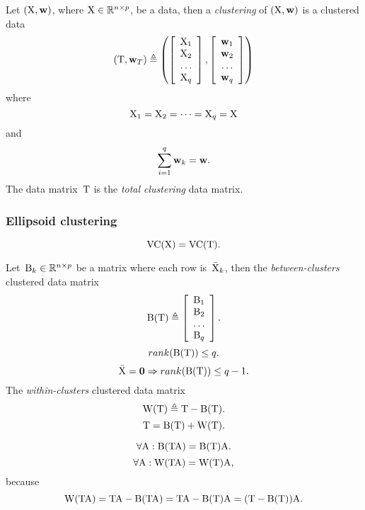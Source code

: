 \documentclass[10pt,a4paper]{article}
\theoremstyle{plain} \newtheorem{Lem}{Lemma}
\begin{document}
\bigskip
Let $(\mathrm X, \mathbf w)$, where $\mathrm X \in \mathbb R^{n \times p}$, be a data, then a {\em clustering} of $(\mathrm X, \mathbf w)$ is a clustered data 
$$ (\mathrm T, \mathbf w_T) \triangleq
   \left (
     \left[ 
       \begin{array}{c} 
         \mathrm X_1 \\ 
         \mathrm X_2 \\ 
         \dots \\ 
         \mathrm X_q 
       \end{array} 
     \right],
     \left[ 
       \begin{array}{c} 
          \mathbf w_1 \\ 
          \mathbf w_2 \\ 
          \dots \\ 
          \mathbf w_q 
       \end{array} 
     \right]
   \right)
$$
where 
$$ \mathrm X_1 = \mathrm X_2 = \dots = \mathrm X_q = \mathrm X $$
and
$$ \sum_{i=1}^q \mathbf w_k = \mathbf w. $$
The data matrix~$\mathrm T$ is the {\em total clustering} data matrix.


\subsubsection{Ellipsoid clustering}

\bigskip
$$ \mathrm {VC}(\mathrm X) = \mathrm {VC} (\mathrm T). $$

\bigskip
Let~$\mathrm B_k \in \mathbb R^{n \times p}$ be a matrix where each row is~$\bar {\mathrm X}_k$,
then the {\em between-clusters} clustered data matrix
$$ \mathrm B(\mathrm T) \triangleq 
     \left[ 
       \begin{array}{c} 
         \mathrm B_1 \\ 
         \mathrm B_2 \\ 
         \dots \\ 
         \mathrm B_q 
       \end{array} 
     \right].
$$
$$ rank(\mathrm B(\mathrm T)) \le q. $$
$$ \bar {\mathrm X} = \mathbf 0 \Rightarrow rank(\mathrm B(\mathrm T)) \le q - 1. $$
The {\em within-clusters} clustered data matrix
$$ \mathrm W(\mathrm T) \triangleq \mathrm T - \mathrm B(\mathrm T). $$
$$ \mathrm T = \mathrm B(\mathrm T) + \mathrm W(\mathrm T). $$

\bigskip
$$ \forall \mathrm A : \mathrm B(\mathrm T \mathrm A) = \mathrm B(\mathrm T) \mathrm A. $$
$$ \forall \mathrm A : \mathrm W(\mathrm T \mathrm A) = \mathrm W(\mathrm T) \mathrm A, $$
because
$$ \mathrm W(\mathrm T \mathrm A) = \mathrm T \mathrm A - \mathrm B(\mathrm T \mathrm A) = \mathrm T \mathrm A - \mathrm B(\mathrm T) \mathrm A = (\mathrm T - \mathrm B(\mathrm T)) \mathrm A. $$
\end{document}
